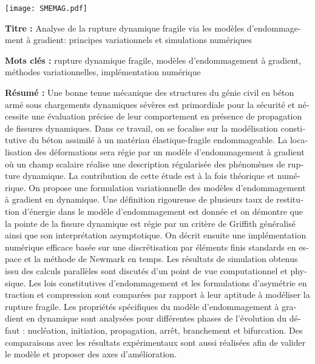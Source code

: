 \pagestyle{empty}

\begin{flushleft}
\texttt{[image: SMEMAG.pdf]}

\vspace{20pt}

\begin{mdframed}
\begin{otherlanguage}{french}
\textbf{Titre :} Analyse de la rupture dynamique fragile via les modèles d'endommagement à gradient: principes variationnels et simulations numériques

\textbf{Mots clés :} rupture dynamique fragile, modèles d'endommagement à gradient, méthodes variationnelles, implémentation numérique

\textbf{Résumé :} Une bonne tenue mécanique des structures du génie civil en béton armé sous chargements dynamiques sévères est primordiale pour la sécurité et nécessite une évaluation précise de leur comportement en présence de propagation de fissures dynamiques. Dans ce travail, on se focalise sur la modélisation constitutive du béton assimilé à un matériau élastique-fragile endommageable. La localisation des déformations sera régie par un modèle d'endommagement à gradient où un champ scalaire réalise une description régularisée des phénomènes de rupture dynamique. La contribution de cette étude est à la fois théorique et numérique. On propose une formulation variationnelle des modèles d'endommagement à gradient en dynamique. Une définition rigoureuse de plusieurs taux de restitution d'énergie dans le modèle d'endommagement est donnée et on démontre que la pointe de la fissure dynamique est régie par un critère de Griffith généralisé ainsi que son interprétation asymptotique. On décrit ensuite une implémentation numérique efficace basée sur une discrétisation par éléments finis standards en espace et la méthode de Newmark en temps. Les résultats de simulation obtenus issu des calculs parallèles sont discutés d'un point de vue computationnel et physique. Les lois constitutives d'endommagement et les formulations d'asymétrie en traction et compression sont comparées par rapport à leur aptitude à modéliser la rupture fragile. Les propriétés spécifiques du modèle d'endommagement à gradient en dynamique sont analysées pour différentes phases de l'évolution du défaut : nucléation, initiation, propagation, arrêt, branchement et bifurcation. Des comparaisons avec les résultats expérimentaux sont aussi réalisées afin de valider le modèle et proposer des axes d'amélioration.
\end{otherlanguage}
\end{mdframed}


\end{flushleft}
